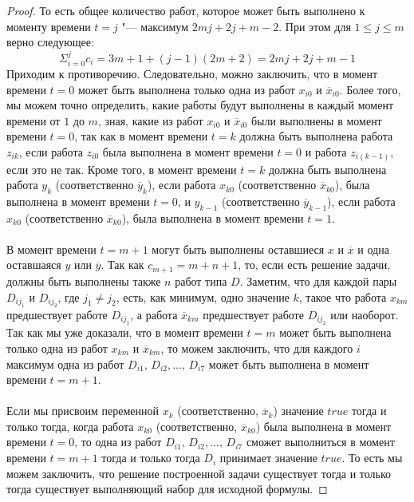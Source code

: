 \documentclass[a4paper,12pt]{article}
\theoremstyle{plain} %
\theoremstyle{definition} %
\theoremstyle{remark} %
\begin{document}
\begin{proof}
	То есть общее количество работ, которое может быть выполнено к моменту времени $t = j$ "--- максимум $2mj + 2j + m - 2$. При этом для $1 \le j \le m$ верно следующее:
	\begin{equation}
		\Sigma_{i = 0}^j c_i = 3m + 1 + (j - 1)(2m + 2) = 2mj + 2j + m - 1
	\end{equation}
	Приходим к противоречию. Следовательно, можно заключить, что в момент времени $t = 0$ может быть выполнена только одна из работ $x_{i0}$ и $\overline{x}_{i0}$. Более того, мы можем точно определить, какие работы будут выполнены в каждый момент времени от $1$ до $m$, зная, какие из работ $x_{i0}$ и $\overline{x}_{i0}$ были выполнены в момент времени $t = 0$, так как в момент времени $t = k$ должна быть выполнена работа $z_{ik}$, если работа $z_{i0}$ была выполнена в момент времени $t = 0$ и работа $z_{i(k - 1)}$, если это не так. Кроме того, в момент времени $t = k$ должна быть выполнена работа $y_k$ (соответственно $\overline{y}_k$), если работа $x_{k0}$ (соответственно $\overline{x}_{k0}$), была выполнена в момент времени $t = 0$, и $y_{k - 1}$ (соответственно $\overline{y}_{k - 1}$), если работа $x_{k0}$ (соответственно $\overline{x}_{k0}$), была выполнена в момент времени $t = 1$.\\ \\
	В момент времени $t = m + 1$ могут быть выполнены оставшиеся $x$ и $\overline{x}$ и одна оставшаяся $y$ или $\overline{y}$. Так как $c_{m + 1} = m + n + 1$, то, если есть решение задачи, должны быть выполнены также $n$ работ типа $D$. Заметим, что для каждой пары $D_{i j_1}$ и $D_{i j_2}$, где $j_1 \ne j_2$, есть, как минимум, одно значение $k$, такое что работа $x_{km}$ предшествует работе $D_{i j_1}$, а работа $\overline{x}_{km}$ предшествует работе $D_{i j_2}$ или наоборот. Так как мы уже доказали, что в момент времени $t = m$ может быть выполнена только одна из работ $x_{km}$ и $\overline{x}_{km}$, то можем заключить, что для каждого $i$ максимум одна из работ $D_{i1}, \, D_{i2}, ..., \, D_{i7}$ может быть выполнена в момент времени $t = m + 1$.\\ \\
	Если мы присвоим переменной $x_k$ (соответственно, $\overline{x}_k$) значение $true$ тогда и только тогда, когда работа $x_{k0}$ (соответственно, $\overline{x}_{k0}$) была выполнена в момент времени $t = 0$, то одна из работ $D_{i1}, \, D_{i2}, ..., \, D_{i7}$ сможет выполниться в момент времени $t = m + 1$ тогда и только тогда $D_i$ принимает значение $true$. То есть мы можем заключить, что решение построенной задачи существует тогда и только тогда существует выполняющий набор для исходной формулы.
	
\end{proof}
\end{document}
